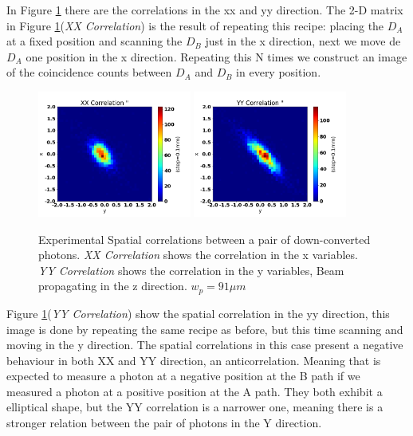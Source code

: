 In Figure \ref{fig:expCorrelations} there are the correlations in the xx and yy  direction.
The 2-D matrix in Figure \ref{fig:expCorrelations}(\textit{XX Correlation}) is
 the result of repeating this recipe: placing the $D_A$ at a fixed position and scanning the $D_B$ just in the 
x direction, next we move de $D_A$ one position in the x direction. Repeating this N times 
we construct an image of the coincidence counts between $D_A$ and $D_B$ in every position.

\begin{figure}[h!]
\centering
{  \includegraphics[width=0.45\textwidth]{Figures/xxCorrelation.png} }
{  \includegraphics[width=0.45\textwidth]{Figures/yyCorrelation.png} }
\caption{Experimental Spatial correlations between a pair of down-converted photons. \textit{XX Correlation} shows the correlation in the x variables. \textit{YY Correlation} shows the correlation in the y variables, Beam propagating in the z direction. $w_p = 91\mu m$}
 \label{fig:expCorrelations}
\end{figure}

Figure \ref{fig:expCorrelations}(\textit{YY Correlation}) show the spatial correlation in 
the yy direction, this image is done by repeating the same recipe as before, but this 
time scanning and moving in the y direction.
The spatial correlations in this case present a negative behaviour in both XX and YY direction, an anticorrelation.
Meaning that is expected to measure a photon at a negative position at the B 
path if we measured a photon at a positive position at the A path. They both exhibit a elliptical
shape, but the YY correlation is a narrower one, meaning there is a stronger relation
between the pair of photons in the Y direction.

